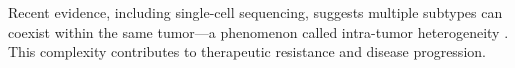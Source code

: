 Recent evidence, including single-cell sequencing, suggests multiple subtypes
can coexist within the same tumor—a phenomenon called intra-tumor heterogeneity
\textcite{intratumor_heterogeneity_Yeo2017,origins_and_evolution_bca_Polyak2007}.
This complexity contributes to therapeutic resistance and disease progression.

